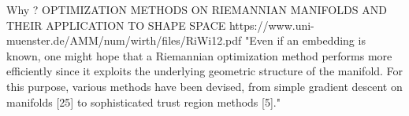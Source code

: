 \documentclass[11pt]{article}
\begin{document}
Why ? OPTIMIZATION METHODS ON RIEMANNIAN MANIFOLDS AND THEIR APPLICATION TO SHAPE SPACE
https://www.uni-muenster.de/AMM/num/wirth/files/RiWi12.pdf
"Even if an embedding is known, one might hope that a
Riemannian optimization method performs more efficiently since it exploits the underlying geometric structure of the
manifold. For this purpose, various methods have been devised, from simple gradient descent on manifolds [25] to
sophisticated trust region methods [5]."
\end{document}
